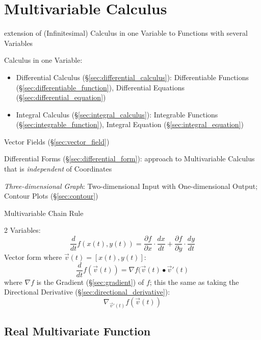 \section{Multivariable Calculus}\label{sec:multivariable_calculus}

extension of (Infinitesimal) Calculus in one Variable to Functions with several
Variables

Calculus in one Variable:
\begin{itemize}
\item Differential Calculus (\S\ref{sec:differential_calculus}): Differentiable
  Functions (\S\ref{sec:differentiable_function}), Differential Equations
  (\S\ref{sec:differential_equation})
\item Integral Calculus (\S\ref{sec:integral_calculus}): Integrable Functions
  (\S\ref{sec:integrable_function}), Integral Equation
  (\S\ref{sec:integral_equation})
\end{itemize}

\fist Vector Fields (\S\ref{sec:vector_field})

\fist Differential Forms (\S\ref{sec:differential_form}): approach to
Multivariable Calculus that is \emph{independent} of Coordinates

\emph{Three-dimensional Graph}: Two-dimensional Input with One-dimensional
Output; Contour Plots (\S\ref{sec:contour})

Multivariable Chain Rule

2 Variables:
\[
  \frac{d}{dt} f(x(t),y(t)) =
    \frac{\partial{f}}{\partial{x}} \cdot \frac{dx}{dt}
      + \frac{\partial{f}}{\partial{y}} \cdot \frac{dy}{dt}
\]
Vector form where $\vec{v}(t) = [x(t),y(t)]$:
\[
  \frac{d}{dt}f(\vec{v}(t)) = \nabla{f(\vec{v}(t)}\bullet{\vec{v}'(t)}
\]
where $\nabla{f}$ is the Gradient (\S\ref{sec:gradient}) of $f$; this the same
as taking the Directional Derivative (\S\ref{sec:directional_derivative}):
\[
  \nabla_{\vec{v}'(t)}f(\vec{v}(t))
\]



\subsection{Real Multivariate Function}\label{sec:real_multivariate_function}

